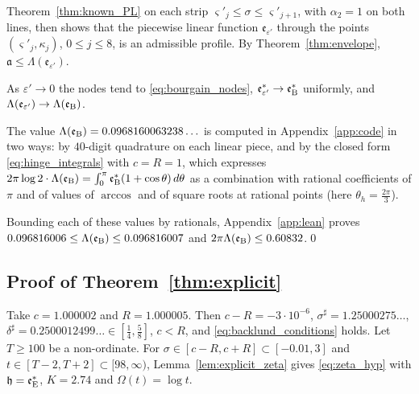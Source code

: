 \documentclass[11pt,a4paper]{article}
\makeatletter
\numberwithin{equation}{section}
\DeclareRobustCommand{\CGref}[1]{\ref{#1}}
\DeclareRobustCommand{\CGeqref}[1]{\eqref{#1}}
\let\CG@origref\ref
\let\CG@origeqref\eqref
\newcommand{\CG@gettip}[1]{\@ifundefined{CGTip@#1}{#1}{\csname CGTip@#1\endcsname}}
\DeclareRobustCommand{\CGref}[1]{\pdftooltip{\CG@origref{#1}}{\CG@gettip{#1}}}
\DeclareRobustCommand{\CGeqref}[1]{\pdftooltip{\CG@origeqref{#1}}{\CG@gettip{#1}}}
\theoremstyle{definition}
\theoremstyle{remark}
\newcommand{\eB}{\mathfrak e_{\rm B}}
\newcommand{\eE}{\mathfrak e_{\rm E}}
\makeatother
\begin{document}
Theorem~\CGref{thm:known_PL} on each strip $\varsigma'_j\le\sigma\le\varsigma'_{j+1}$, with $\alpha_2=1$ on both lines, then shows that the piecewise linear function $\mathfrak e_{\varepsilon'}$ through the points $(\varsigma'_j,\kappa_j)$, $0\le j\le8$, is an admissible profile. By Theorem~\CGref{thm:envelope}, $\mathfrak a\le\Lambda(\mathfrak e_{\varepsilon'})$.

As $\varepsilon'\to0$ the nodes tend to \CGeqref{eq:bourgain_nodes}, $\mathfrak e^*_{\varepsilon'}\to\eB^*$ uniformly, and $\Lambda(\mathfrak e_{\varepsilon'})\to\Lambda(\eB)$.

The value $\Lambda(\eB)=0.0968160063238\ldots$ is computed in Appendix~\CGref{app:code} in two ways: by $40$-digit quadrature on each linear piece, and by the closed form \CGeqref{eq:hinge_integrals} with $c=R=1$, which expresses $2\pi\log2\cdot\Lambda(\eB)=\int_0^\pi\eB^*(1+\cos\theta)\,d\theta$ as a combination with rational coefficients of $\pi$ and of values of $\arccos$ and of square roots at rational points (here $\theta_h=\frac{2\pi}3$).

Bounding each of these values by rationals, Appendix~\CGref{app:lean} proves $0.096816006\le\Lambda(\eB)\le0.096816007$ and $2\pi\Lambda(\eB)\le0.60832$.\qed

\subsection{Proof of Theorem~\ref{thm:explicit}}\label{subsec:proof_explicit}
Take $c=1.000002$ and $R=1.000005$. Then $c-R=-3\cdot10^{-6}$, $\sigma^\sharp=1.25000275\ldots$, $\delta^\sharp=0.2500012499\ldots\in[\frac14,\frac58]$, $c<R$, and \CGeqref{eq:backlund_conditions} holds. Let $T\ge100$ be a non-ordinate. For $\sigma\in[c-R,c+R]\subset[-0.01,3]$ and $t\in[T-2,T+2]\subset[98,\infty)$, Lemma~\CGref{lem:explicit_zeta} gives \CGeqref{eq:zeta_hyp} with $\mathfrak h=\eE^*$, $K=2.74$ and $\Omega(t)=\log t$.
\end{document}
